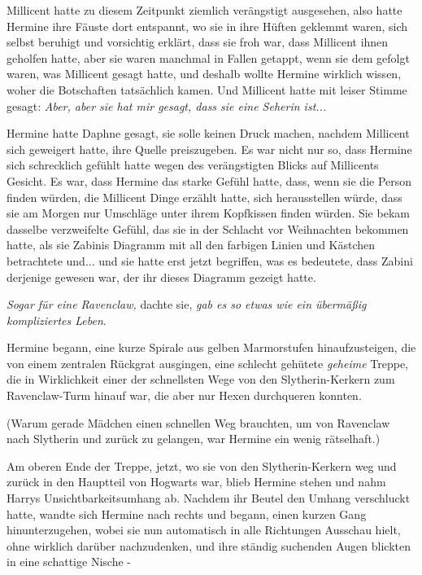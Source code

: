 Millicent hatte zu diesem Zeitpunkt ziemlich verängstigt ausgesehen, also hatte
Hermine ihre Fäuste dort entspannt, wo sie in ihre Hüften geklemmt waren, sich
selbst beruhigt und vorsichtig erklärt, dass sie froh war, dass Millicent ihnen
geholfen hatte, aber sie waren manchmal in Fallen getappt, wenn sie dem gefolgt
waren, was Millicent gesagt hatte, und deshalb wollte Hermine wirklich wissen,
woher die Botschaften tatsächlich kamen. Und Millicent hatte mit leiser Stimme
gesagt: \emph{Aber, aber sie hat mir gesagt, dass sie eine Seherin ist...}

Hermine hatte Daphne gesagt, sie solle keinen Druck machen, nachdem Millicent
sich geweigert hatte, ihre Quelle preiszugeben. Es war nicht nur so, dass
Hermine sich schrecklich gefühlt hatte wegen des verängstigten Blicks auf
Millicents Gesicht. Es war, dass Hermine das starke Gefühl hatte, dass, wenn sie
die Person finden würden, die Millicent Dinge erzählt hatte, sich herausstellen
würde, dass sie am Morgen nur Umschläge unter ihrem Kopfkissen finden würden.
Sie bekam dasselbe verzweifelte Gefühl, das sie in der Schlacht vor Weihnachten
bekommen hatte, als sie Zabinis Diagramm mit all den farbigen Linien und
Kästchen betrachtete und... und sie hatte erst jetzt begriffen, was es
bedeutete, dass Zabini derjenige gewesen war, der ihr dieses Diagramm gezeigt
hatte.

\emph{Sogar für eine Ravenclaw,} dachte sie, \emph{gab es so etwas wie ein
übermäßig kompliziertes Leben}.

Hermine begann, eine kurze Spirale aus gelben Marmorstufen hinaufzusteigen, die
von einem zentralen Rückgrat ausgingen, eine schlecht gehütete \glqq
\emph{geheime}\grqq{} Treppe, die in Wirklichkeit einer der schnellsten Wege von
den Slytherin-Kerkern zum Ravenclaw-Turm hinauf war, die aber nur Hexen
durchqueren konnten.

(Warum gerade Mädchen einen schnellen Weg brauchten, um von Ravenclaw nach
Slytherin und zurück zu gelangen, war Hermine ein wenig rätselhaft.)

Am oberen Ende der Treppe, jetzt, wo sie von den Slytherin-Kerkern weg und
zurück in den Hauptteil von Hogwarts war, blieb Hermine stehen und nahm Harrys
Unsichtbarkeitsumhang ab. Nachdem ihr Beutel den Umhang verschluckt hatte,
wandte sich Hermine nach rechts und begann, einen kurzen Gang hinunterzugehen,
wobei sie nun automatisch in alle Richtungen Ausschau hielt, ohne wirklich
darüber nachzudenken, und ihre ständig suchenden Augen blickten in eine
schattige Nische -


